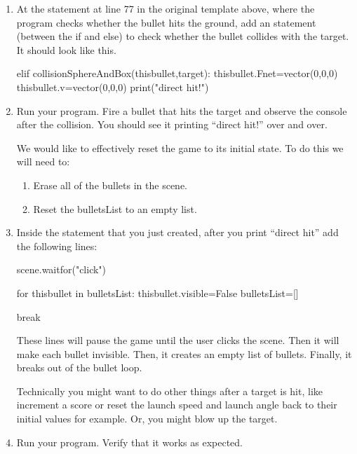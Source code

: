 \begin{enumerate}
	\item At the  statement at line 77 in the original template above, where the program checks whether the bullet hits the ground, add an  statement (between the if and else) to check whether the bullet collides with the target. It should look like this.
	
\begin{myvpython}
        elif collisionSphereAndBox(thisbullet,target):
            thisbullet.Fnet=vector(0,0,0)
            thisbullet.v=vector(0,0,0)
            print("direct hit!")
\end{myvpython}



	\item Run your program. Fire a bullet that hits the target and observe the console after the collision. You should see it printing ``direct hit!'' over and over.
	

We would like to effectively reset the game to its initial state. To do this we will need to:
	
	\begin{enumerate}
		\item Erase all of the bullets in the scene.
		\item Reset the bulletsList to an empty list.
	\end{enumerate}

\newpage

	\item Inside the  statement that you just created, after you print ``direct hit'' add the following lines:
	
\begin{myvpython}
            scene.waitfor("click")
            
            for thisbullet in bulletsList:
                thisbullet.visible=False
            bulletsList=[]
        
            break
\end{myvpython}

These lines will pause the game until the user clicks the scene. Then it will make each bullet invisible. Then, it creates an empty list of bullets. Finally, it breaks out of the bullet loop.
	
Technically you might want to do other things after a target is hit, like increment a score or reset the launch speed and launch angle back to their initial values for example. Or, you might blow up the target.
    
    \item Run your program. Verify that it works as expected.

\end{enumerate}

